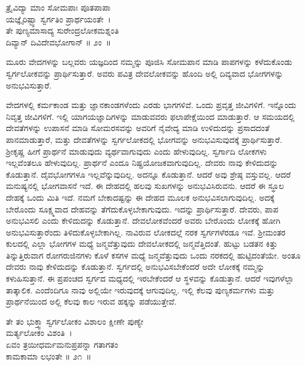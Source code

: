 \begin{shloka}
ತ್ರೈವಿದ್ಯಾ ಮಾಂ ಸೋಮಪಾಃ ಪೂತಪಾಪಾ\\ ಯಜ್ಞೈರಿಷ್ಟ್ವಾ ಸ್ವರ್ಗತಿಂ ಪ್ರಾರ್ಥಯಂತೇ~।\\ತೇ ಪುಣ್ಯಮಾಸಾದ್ಯ ಸುರೇಂದ್ರಲೋಕಮಶ್ನಂತಿ\\ ದಿವ್ಯಾನ್ ದಿವಿದೇವಭೋಗಾನ್ \hfill॥ ೨ಂ~॥
\end{shloka}

\begin{artha}
ಮೂರು ವೇದಗಳನ್ನು ಬಲ್ಲವರು ಯಜ್ಞದಿಂದ ನಮ್ಮನ್ನು ಪೂಜಿಸಿ ಸೋಮಪಾನ ಮಾಡಿ ಪಾಪಗಳನ್ನು ಕಳೆದುಕೊಂಡು ಸ್ವರ್ಗಲೋಕವನ್ನು ಪ್ರಾರ್ಥಿಸುತ್ತಾರೆ. ಅವರು ಪವಿತ್ರ ದೇವಲೋಕವನ್ನು ಹೊಂದಿ ಅಲ್ಲಿ ದಿವ್ಯವಾದ ಭೋಗಗಳನ್ನು ಅನುಭವಿಸುತ್ತಾರೆ.
\end{artha}

ವೇದಗಳಲ್ಲಿ ಕರ್ಮಕಾಂಡ ಮತ್ತು ಜ್ಞಾನಕಾಂಡಗಳೆಂದು ಎರಡು ಭಾಗಗಳಿವೆ. ಒಂದು ಪ್ರವೃತ್ತ ಜೀವಿಗಳಿಗೆ. ಇನ್ನೊಂದು ನಿವೃತ್ತ ಜೀವಿಗಳಿಗೆ. ಇಲ್ಲಿ ಯಾಗಯಜ್ಞಾದಿಗಳನ್ನು ಮಾಡುವವರು ಫಲಾಪೇಕ್ಷೆಯಿಂದ ಮಾಡುತ್ತಾರೆ. ಆ ಸಮಯದಲ್ಲಿ ದೇವತೆಗಳನ್ನು ಉಪಾಸನೆ ಮಾಡಿ ಸೋಮರಸವನ್ನು ಅವರಿಗೆ ನೈವೇದ್ಯ ಮಾಡಿ ಉಳಿದುದನ್ನು ಪ್ರಸಾದದಂತೆ ಪಾನಮಾಡುತ್ತಾರೆ, ಮತ್ತು ದೇವತೆಗಳನ್ನು ಸ್ವರ್ಗಲೋಕದಲ್ಲಿ ಭೋಗವನ್ನು ಅನುಭವಿಸುವುದಕ್ಕೆ ಪ್ರಾರ್ಥಿಸುತ್ತಾರೆ. ಶ‍್ರೀಕೃಷ್ಣ ಹೀಗೆ ಪ್ರಾರ್ಥನೆ ಮಾಡುವುದು ವ್ಯರ್ಥವಾಗುವುದು ಎಂದು ಹೇಳುವುದಿಲ್ಲ. ಸ್ವರ್ಗಾದಿ ಲೋಕಗಳು ಇಲ್ಲವೆಂತಲೂ ಹೇಳುವುದಿಲ್ಲ. ಪ್ರಾರ್ಥನೆ ಎಂದೂ ನಿಷ್ಪ್ರಯೋಜಕವಾಗುವುದಿಲ್ಲ. ದೇವರು ನಾವು ಕೇಳಿದುದನ್ನು ಕೊಡುತ್ತಾನೆ. ದೈವಭೋಗಗಳೂ ಇಲ್ಲವೆನ್ನುವುದಿಲ್ಲ. ಅದನ್ನೂ ಕೊಡುತ್ತಾನೆ. ಆದರೆ ಅವು ಶ್ರೇಷ್ಠ ವಸ್ತುವಲ್ಲ. ಆದರೆ ಮನುಷ್ಯನಲ್ಲಿ ಭೋಗವಾಸನೆ ಇದೆ. ಈ ದೇಹದಲ್ಲಿ ಹಲವು ಸುಖಗಳನ್ನು ಅನುಭವಿಸಿರುವನು. ಆದರೆ ಈ ಸ್ಥೂಲ ದೇಹಕ್ಕೆ ಒಂದು ಮಿತಿ ಇದೆ. ನಮಗೆ ಬೇಕಾದಷ್ಟನ್ನು ಈ ದೇಹದ ಮೂಲಕ ಅನುಭವಿಸಲಾಗುವುದಿಲ್ಲ. ಅದಕ್ಕೆ ಬೇರೊಂದು ಸೂಕ್ಷ್ಮವಾದ ದೇಹವನ್ನು ತೆಗೆದುಕೊಳ್ಳಬೇಕಾಗುವುದು. ಇದನ್ನು ಪ್ರಾರ್ಥಿಸುತ್ತಾರೆ. ದೇವರು, ಪಾಪ ಅನುಭವಿಸಲಿ ಎಂದು ಕೇಳಿದುದನ್ನು ಕೊಡುತ್ತಾನೆ. ದೇವಲೋಕವೆಂದರೆ ಅವರು ಬೇರೊಂದು ಲೋಕಕ್ಕೆ ಹೋಗಿ ಅನುಭವಿಸುತ್ತಾರೆಂದು ತಿಳಿದುಕೊಳ್ಳಬೇಕಾಗಿಲ್ಲ. ನಾವಿರುವ ಲೋಕದಲ್ಲೆ ನರಕ ಸ್ವರ್ಗಗಳೆರಡೂ ಇವೆ. ಶ‍್ರೀಮಂತರ ಕುಲದಲ್ಲಿ ಎಲ್ಲಾ ಭೋಗಗಳ ಮಧ್ಯೆ ಜನ್ಮವೆತ್ತುವುದು ದೇವಲೋಕದಲ್ಲಿ ಜನ್ಮವೆತ್ತಿದಂತೆ. ಹುಟ್ಟು ಬಡತನ ಕಿತ್ತು ತಿನ್ನುತ್ತಿರುವಾಗ ರೋಗರುಜಿನಗಳು ಕೊಳೆ ಕಸಗಳ ಮಧ್ಯೆ ಜನ್ಮವೆತ್ತುವುದು ಒಂದು ನರಕದಲ್ಲಿ ಹುಟ್ಟಿದಂತೆಯೇ. ಅಂತೂ ದೇವರು ನಾವು ಕೇಳಿದುದನ್ನು ಕೊಡುತ್ತಾನೆ. ಸ್ವರ್ಗದಲ್ಲಿ ಅನುಭವಿಸಬೇಕೆಂದರೆ ಅದೇ ಲೋಕಕ್ಕೆ ನಮ್ಮನ್ನು ಕಳುಹಿಸುತ್ತಾನೆ. ಈ ಪ್ರಪಂಚದ ಸ್ವರ್ಗದ ಮಧ್ಯದಲ್ಲಿ ಇರಬೇಕೆಂದರೆ ಆ ಸ್ಥಳವನ್ನು ಕೊಡುತ್ತಾನೆ. ಆದರೆ ಇವುಗಳೆಲ್ಲಾ ತಾತ್ಕಾಲಿಕ. ಎಂದೆಂದಿಗೂ ನಾವು ಅಲ್ಲಿಯೇ ಇರುವುದಕ್ಕೆ ಆಗುವುದಿಲ್ಲ. ಇಲ್ಲಿ ಕೆಲವು ಪುಣ್ಯಕರ್ಮಗಳು ಮತ್ತು ಪ್ರಾರ್ಥನೆಯಿಂದ ಅಲ್ಲಿ ಕೆಲವು ಕಾಲ ಇರುವ ಹಕ್ಕನ್ನು ಪಡೆಯುತ್ತೇವೆ.

\begin{shloka}
ತೇ ತಂ ಭುಕ್ತ್ವಾ ಸ್ವರ್ಗಲೋಕಂ ವಿಶಾಲಂ ಕ್ಷೀಣೇ ಪುಣ್ಯೇ\\ ಮರ್ತ್ಯಲೋಕಂ ವಿಶಂತಿ~।\\ಏವಂ ತ್ರಯೀಧರ್ಮಮನುಪ್ರಪನ್ನಾ ಗತಾಗತಂ\\ ಕಾಮಕಾಮಾ ಲಭಂತೇ \hfill॥ ೨೧~॥
\end{shloka}

